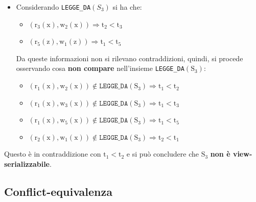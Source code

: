 {\begin{itemize}[label=$\circ$, itemsep=\medskipamount]
    \item Considerando \texttt{LEGGE\_DA}\( (S_3) \) si ha che:
      \begin{itemize}[itemsep=\smallskipamount]
        \item \( \mathrm{(r_3(x), w_2(x))} \Rightarrow \mathrm{t_2 < t_3} \)
        \item \( \mathrm{(r_5(z), w_1(z))} \Rightarrow \mathrm{t_1 < t_5} \)
      \end{itemize}
      Da queste informazioni non si rilevano contraddizioni, quindi, si procede
      osservando cosa \textbf{non compare} nell'insieme \texttt{LEGGE\_DA}\( (\mathrm{S_3}) \):
      \begin{itemize}[itemsep=\smallskipamount]
        \item \( \mathrm{(r_1(x), w_2(x))} \notin \texttt{LEGGE\_DA}(\mathrm{S_3}) \Rightarrow
           \mathrm{t_1 < t_2} \)

         \item \( \mathrm{(r_1(x), w_3(x))} \notin \texttt{LEGGE\_DA}(\mathrm{S_3}) \Rightarrow
           \mathrm{t_1 < t_3} \)

         \item \( \mathrm{(r_1(x), w_5(x))} \notin \texttt{LEGGE\_DA}\mathrm{(S_3)} \Rightarrow
           \mathrm{t_1 < t_5} \)

         \item \( \mathrm{(r_2(x), w_1(x))} \notin \texttt{LEGGE\_DA}\mathrm{(S_3)} \Rightarrow
           \mathrm{t_2 < t_1} \)
       \end{itemize}
  \end{itemize}

  \smallskip
  Questo è in contraddizione con \( \mathrm{t_1 < t_2} \) e si può concludere che \( \mathrm{S_3} \) \textbf{non è view-serializzabile}.
}

\subsection{Conflict-equivalenza}

